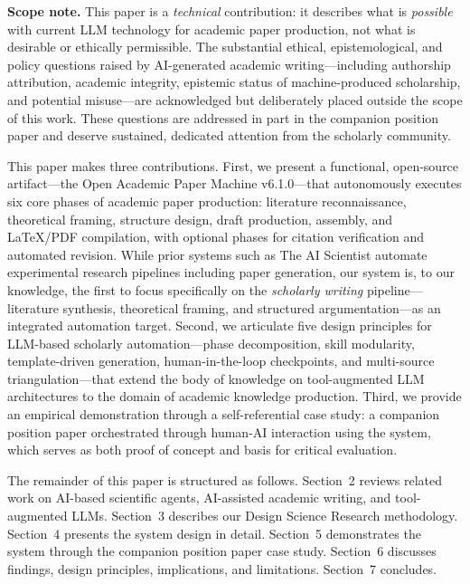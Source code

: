 \documentclass{article}
\begin{document}
\medskip
\noindent\textbf{Scope note.} This paper is a \emph{technical} contribution: it describes what is \emph{possible} with current LLM technology for academic paper production, not what is desirable or ethically permissible. The substantial ethical, epistemological, and policy questions raised by AI-generated academic writing---including authorship attribution, academic integrity, epistemic status of machine-produced scholarship, and potential misuse---are acknowledged but deliberately placed outside the scope of this work. These questions are addressed in part in the companion position paper \citep{blask2026creator} and deserve sustained, dedicated attention from the scholarly community.
\medskip

This paper makes three contributions. First, we present a functional, open-source artifact---the Open Academic Paper Machine v6.1.0---that autonomously executes six core phases of academic paper production: literature reconnaissance, theoretical framing, structure design, draft production, assembly, and \LaTeX/PDF compilation, with optional phases for citation verification and automated revision. While prior systems such as The AI Scientist \citep{lu2024ai_scientist} automate experimental research pipelines including paper generation, our system is, to our knowledge, the first to focus specifically on the \emph{scholarly writing} pipeline---literature synthesis, theoretical framing, and structured argumentation---as an integrated automation target. Second, we articulate five design principles for LLM-based scholarly automation---phase decomposition, skill modularity, template-driven generation, human-in-the-loop checkpoints, and multi-source triangulation---that extend the body of knowledge on tool-augmented LLM architectures to the domain of academic knowledge production. Third, we provide an empirical demonstration through a self-referential case study: a companion position paper \citep{blask2026creator} orchestrated through human-AI interaction using the system, which serves as both proof of concept and basis for critical evaluation.

The remainder of this paper is structured as follows. Section~2 reviews related work on AI-based scientific agents, AI-assisted academic writing, and tool-augmented LLMs. Section~3 describes our Design Science Research methodology. Section~4 presents the system design in detail. Section~5 demonstrates the system through the companion position paper case study. Section~6 discusses findings, design principles, implications, and limitations. Section~7 concludes.
\end{document}
